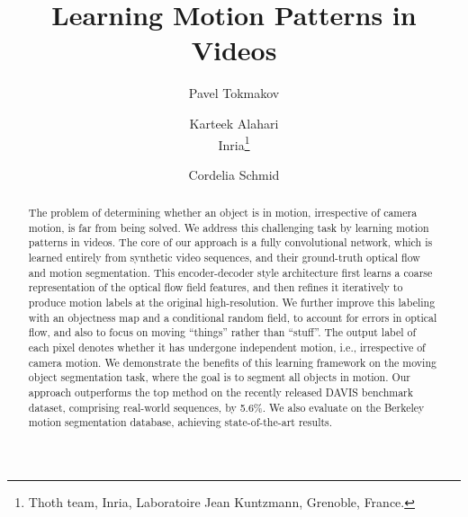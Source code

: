 \documentclass[10pt,twocolumn,letterpaper]{article}
\begin{document}
\newcommand{\sixfigures}[7]{
            \centerline{{\texttt{[image: \#1]}}~~{\texttt{[image: \#2]}}~~{\texttt{[image: \#3]}}~~{\texttt{[image: \#4]}}~~{\texttt{[image: \#5]}}~~{\texttt{[image: \#6]}}}}
            
\newcommand{\sixfiguresdots}[7]{
            \centerline{{\texttt{[image: \#1]}}~~{\texttt{[image: \#2]}}~~{\texttt{[image: \#3]}}~~{...}~~{\texttt{[image: \#4]}}~~{\texttt{[image: \#5]}}~~{\texttt{[image: \#6]}}}}            


\newcommand{\threefigurescaption}[7]{
            \centerline{{\texttt{[image: \#1]}}~~{\texttt{[image: \#2]}}~~{\texttt{[image: \#3]}}}
		     \makebox[#4][c]{#5}\makebox[#4][c]{#6}\makebox[#4][c]{#7}}

\newcommand{\comment}[1]{}

\newcommand{\twofigurescaption}[6]{
            \centerline{{\texttt{[image: \#1]}}~~{\texttt{[image: \#2]}}}
            \makebox[#6][c]{#4}\makebox[#6][c]{#5}}

\newcommand{\todo}[1]{{\bf TODO:} #1}

 
\title{Learning Motion Patterns in Videos}

\author{Pavel Tokmakov
\and
Karteek Alahari\vspace{0.3cm}\\
\large{Inria\thanks{Thoth team, Inria, Laboratoire Jean Kuntzmann, Grenoble, France.}\vspace{-0.2cm}}
\and
Cordelia Schmid\\
}
\maketitle

\begin{abstract}
\vspace{-0.3cm}
The problem of determining whether an object is in motion, irrespective of
camera motion, is far from being solved. We address this challenging task by
learning motion patterns in videos. The core of our approach is a fully
convolutional network, which is learned entirely from synthetic video sequences,
and their ground-truth optical flow and motion segmentation. This
encoder-decoder style architecture first learns a coarse representation of the
optical flow field features, and then refines it iteratively to produce motion
labels at the original high-resolution. We further improve this labeling with
an objectness map and a conditional random field, to account for errors in
optical flow, and also to focus on moving ``things'' rather than ``stuff''. The
output label of each pixel denotes whether it has undergone independent motion,
i.e., irrespective of camera motion. We demonstrate the benefits of this
learning framework on the moving object segmentation task, where the goal is to
segment all objects in motion. Our approach outperforms the top method on the
recently released DAVIS benchmark dataset, comprising real-world sequences, by
5.6\%. We also evaluate on the Berkeley motion segmentation database, achieving
state-of-the-art results.
\end{abstract}
\end{document}
